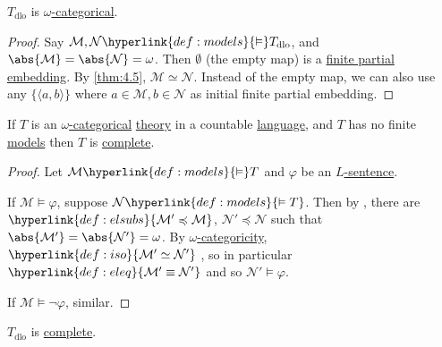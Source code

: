 \documentclass{article}
\let\models\vDash
\begin{document}
\begin{ncor}\label{cor:4.7}
  \hyperlink{def:tlo}{$T_{\text{dlo}}$} is \hyperlink{def:wcat}{$\omega$-categorical}.
\end{ncor}
\begin{proof}
  Say $\mathcal{M},\mathcal{N} \hyperlink{def:models}{\models} T_{\text{dlo}}$, and $\abs{\mathcal{M}} = \abs{\mathcal{N}} = \omega$.
  Then $\emptyset$ (the empty map) is a \hyperlink{def:pe}{finite partial embedding}.
  By \cref{thm:4.5}, $\mathcal{M} \simeq \mathcal{N}$.
  Instead of the empty map, we can also use any $\{\langle a, b \rangle\}$ where $a \in \mathcal{M}, b \in \mathcal{N}$ as initial finite partial embedding.
\end{proof}
\begin{nthm}\label{thm:4.8}
  If $T$ is an \hyperlink{def:wcat}{$\omega$-categorical} \hyperlink{def:ltheory}{theory} in a countable \hyperlink{def:lang}{language}, and $T$ has no finite \hyperlink{def:model}{models} then $T$ is \hyperlink{def:complete}{complete}.
\end{nthm}
\begin{proof}
  Let $\mathcal{M} \hyperlink{def:models}{\models} T$ and $\varphi$ be an \hyperlink{def:sentence}{$L$-sentence}.

  If $\mathcal{M} \models \varphi$, suppose $\mathcal{N} \hyperlink{def:models}{\models T}$.
  Then by , there are $\hyperlink{def:elsubs}{\mathcal{M}' \preccurlyeq \mathcal{M}}$, $\mathcal{N}' \preccurlyeq \mathcal{N}$ such that $\abs{\mathcal{M}'} = \abs{\mathcal{N}'} = \omega$.
  By \hyperlink{def:wcat}{$\omega$-categoricity}, $\hyperlink{def:iso}{\mathcal{M}' \simeq \mathcal{N}'}$ , so in particular $\hyperlink{def:eleq}{\mathcal{M}' \equiv \mathcal{N}'}$ and so $\mathcal{N}' \models \varphi$.

  If $\mathcal{M} \models \lnot \varphi$, similar.
\end{proof}
\begin{ncor}\label{cor:4.9}
  \hyperlink{def:tlo}{$T_{\text{dlo}}$} is \hyperlink{def:complete}{complete}.
\end{ncor}
\end{document}
